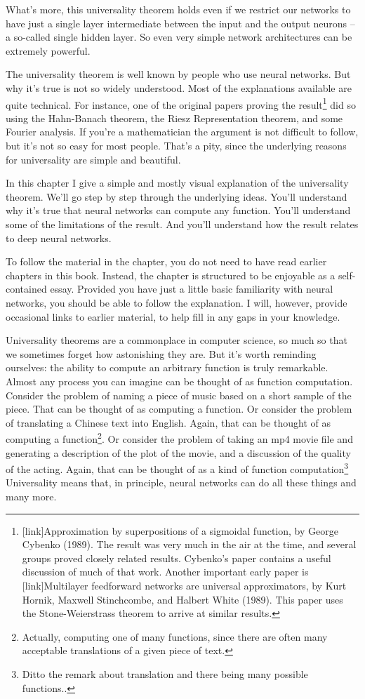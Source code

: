 \documentclass[a4paper,twoside,10pt]{book}
\begin{document}
What's more, this universality theorem holds even if we restrict our networks to have just a single layer intermediate between the input and the output neurons -- a so-called single hidden layer. So even very simple network architectures can be extremely powerful.

The universality theorem is well known by people who use neural networks. But why it's true is not so widely understood. Most of the explanations available are quite technical. For instance, one of the original papers proving the result\footnote{[link]Approximation by superpositions of a sigmoidal function, by George Cybenko (1989). The result was very much in the air at the time, and several groups proved closely related results. Cybenko's paper contains a useful discussion of much of that work. Another important early paper is [link]Multilayer feedforward networks are universal approximators, by Kurt Hornik, Maxwell Stinchcombe, and Halbert White (1989). This paper uses the Stone-Weierstrass theorem to arrive at similar results.} did so using the Hahn-Banach theorem, the Riesz Representation theorem, and some Fourier analysis. If you're a mathematician the argument is not difficult to follow, but it's not so easy for most people. That's a pity, since the underlying reasons for universality are simple and beautiful.

In this chapter I give a simple and mostly visual explanation of the universality theorem. We'll go step by step through the underlying ideas. You'll understand why it's true that neural networks can compute any function. You'll understand some of the limitations of the result. And you'll understand how the result relates to deep neural networks.

To follow the material in the chapter, you do not need to have read earlier chapters in this book. Instead, the chapter is structured to be enjoyable as a self-contained essay. Provided you have just a little basic familiarity with neural networks, you should be able to follow the explanation. I will, however, provide occasional links to earlier material, to help fill in any gaps in your knowledge.

Universality theorems are a commonplace in computer science, so much so that we sometimes forget how astonishing they are. But it's worth reminding ourselves: the ability to compute an arbitrary function is truly remarkable. Almost any process you can imagine can be thought of as function computation. Consider the problem of naming a piece of music based on a short sample of the piece. That can be thought of as computing a function. Or consider the problem of translating a Chinese text into English. Again, that can be thought of as computing a function\footnote{Actually, computing one of many functions, since there are often many acceptable translations of a given piece of text.}. Or consider the problem of taking an mp4 movie file and generating a description of the plot of the movie, and a discussion of the quality of the acting. Again, that can be thought of as a kind of function computation\footnote{Ditto the remark about translation and there being many possible functions..} Universality means that, in principle, neural networks can do all these things and many more.
\end{document}
